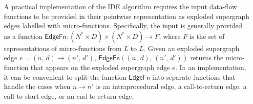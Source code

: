 A practical implementation of the IDE algorithm requires
the input data-flow functions to be provided in their pointwise representation
as exploded supergraph edges labelled with micro-functions.
Specifically,
the input is generally provided as a function $\textsf{EdgeFn}: (N^* \times D) \times (N^* \times D) \to F$,
where $F$ is the set of representations of micro-functions from $L$ to $L$.
Given an exploded supergraph edge $e=(n,\,d) \to (n',\,d')$,
$\textsf{EdgeFn}((n,\,d),\,(n',\,d'))$ returns the micro-function that appears on the exploded supergraph edge $e$.
In an implementation, it can be convenient to split the function $\textsf{EdgeFn}$ into separate functions that handle the cases when $n\to n'$ is an intraprocedural edge, a call-to-return edge, a call-to-start edge, or an end-to-return edge.
